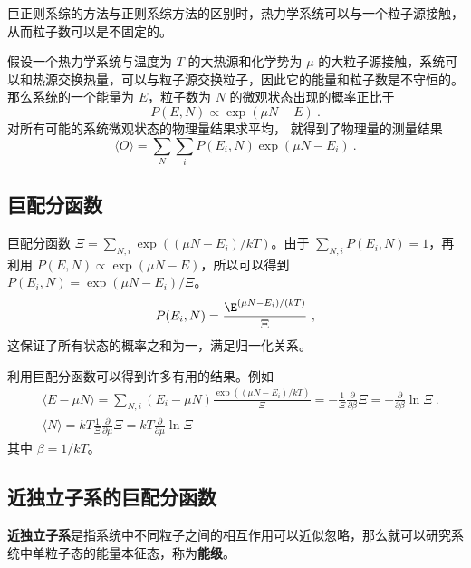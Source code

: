 
\begin{issues}
\issueDraft
\end{issues}

巨正则系综的方法与正则系综方法的区别时，热力学系统可以与一个粒子源接触，从而粒子数可以是不固定的。

假设一个热力学系统与温度为 $T$ 的大热源和化学势为 $\mu$ 的大粒子源接触，系统可以和热源交换热量，可以与粒子源交换粒子，因此它的能量和粒子数是不守恒的。那么系统的一个能量为 $E$，粒子数为 $N$ 的微观状态出现的概率正比于
\begin{equation}
P(E,N)\propto \exp(\mu N-E)~.
\end{equation}
对所有可能的系统微观状态的物理量结果求平均， 就得到了物理量的测量结果
\begin{equation}
\langle O\rangle=\sum_{N}\sum_i P(E_i,N)\exp(\mu N-E_i)~.
\end{equation}


\subsection{巨配分函数}
巨配分函数 $\Xi=\sum_{N,i} \exp((\mu N-E_i)/kT)$。由于 $\sum_{N,i} P(E_i,N)=1$，再利用 $P(E,N)\propto \exp(\mu N-E)$，所以可以得到 $P(E_i,N)=\exp(\mu N-E_i)/\Xi$。
\begin{equation}
P(E_i,N)=\frac{\E^{(\mu N - E_i)/(kT)}}{\Xi}~,
\end{equation}
这保证了所有状态的概率之和为一，满足归一化关系。

利用巨配分函数可以得到许多有用的结果。例如
\begin{equation}\label{eq_MCEsb_1}
\begin{aligned}
&\langle E-\mu N\rangle = \sum_{N,i} (E_i-\mu N) \frac{\exp((\mu N - E_i)/kT)}{\Xi}=-\frac{1}{\Xi}\frac{\partial }{\partial \beta}\Xi=-\frac{\partial}{\partial\beta} \ln \Xi~.\\
&\langle N\rangle =kT \frac{1}{\Xi} \frac{\partial}{\partial \mu}\Xi=kT\frac{\partial}{\partial \mu}\ln \Xi
\end{aligned}
\end{equation}
其中 $\beta=1/kT$。
\subsection{近独立子系的巨配分函数}
\textbf{近独立子系}是指系统中不同粒子之间的相互作用可以近似忽略，那么就可以研究系统中单粒子态的能量本征态，称为\textbf{能级}。

